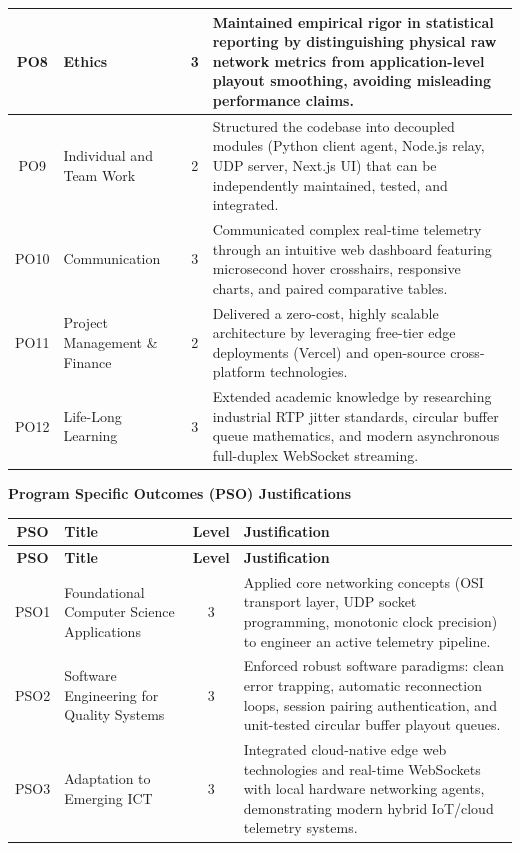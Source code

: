 \documentclass[12pt, a4paper]{report}
\begin{document}
\begin{xltabular}{\textwidth}{|c|p{3.2cm}|c|L|}
\hline
PO8 & Ethics & 3 & Maintained empirical rigor in statistical reporting by distinguishing physical raw network metrics from application-level playout smoothing, avoiding misleading performance claims. \\
\hline
PO9 & Individual and Team Work & 2 & Structured the codebase into decoupled modules (Python client agent, Node.js relay, UDP server, Next.js UI) that can be independently maintained, tested, and integrated. \\
\hline
PO10 & Communication & 3 & Communicated complex real-time telemetry through an intuitive web dashboard featuring microsecond hover crosshairs, responsive charts, and paired comparative tables. \\
\hline
PO11 & Project Management \& Finance & 2 & Delivered a zero-cost, highly scalable architecture by leveraging free-tier edge deployments (Vercel) and open-source cross-platform technologies. \\
\hline
PO12 & Life-Long Learning & 3 & Extended academic knowledge by researching industrial RTP jitter standards, circular buffer queue mathematics, and modern asynchronous full-duplex WebSocket streaming. \\
\hline
\end{xltabular}

\vspace{0.4cm}
\noindent\textbf{\large Program Specific Outcomes (PSO) Justifications}
\vspace{0.2cm}

\begin{xltabular}{\textwidth}{|c|p{3.5cm}|c|L|}
\hline
\textbf{PSO} & \textbf{Title} & \textbf{Level} & \textbf{Justification} \\
\hline
\endfirsthead
\hline
\textbf{PSO} & \textbf{Title} & \textbf{Level} & \textbf{Justification} \\
\hline
\endhead
PSO1 & Foundational Computer Science Applications & 3 & Applied core networking concepts (OSI transport layer, UDP socket programming, monotonic clock precision) to engineer an active telemetry pipeline. \\
\hline
PSO2 & Software Engineering for Quality Systems & 3 & Enforced robust software paradigms: clean error trapping, automatic reconnection loops, session pairing authentication, and unit-tested circular buffer playout queues. \\
\hline
PSO3 & Adaptation to Emerging ICT & 3 & Integrated cloud-native edge web technologies and real-time WebSockets with local hardware networking agents, demonstrating modern hybrid IoT/cloud telemetry systems. \\
\hline
\end{xltabular}
\end{document}
